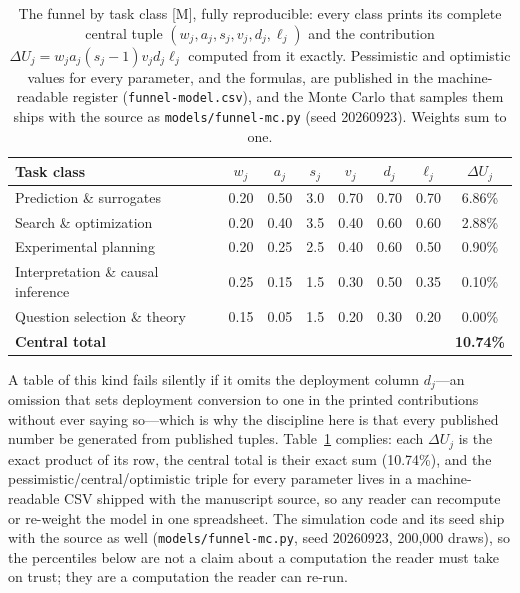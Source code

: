 \begin{table}[htbp]
  \centering
  \scriptsize
  \caption{The funnel by task class [M], fully reproducible: every class prints its complete central tuple $(w_j, a_j, s_j, v_j, d_j, \ell_j)$ and the contribution $\Delta U_j = w_j a_j (s_j{-}1) v_j d_j \ell_j$ computed from it exactly. Pessimistic and optimistic values for every parameter, and the formulas, are published in the machine-readable register (\texttt{funnel-model.csv}), and the Monte Carlo that samples them ships with the source as \texttt{models/funnel-mc.py} (seed 20260923). Weights sum to one.}
  \label{tab:funnel-classes}
  \setlength{\tabcolsep}{4.5pt}
  \begin{tabular}{p{33mm}ccccccc}
    \toprule
    Task class & $w_j$ & $a_j$ & $s_j$ & $v_j$ & $d_j$ & $\ell_j$ & $\Delta U_j$ \\
    \midrule
    Prediction \& surrogates & 0.20 & 0.50 & 3.0 & 0.70 & 0.70 & 0.70 & 6.86\% \\
    Search \& optimization & 0.20 & 0.40 & 3.5 & 0.40 & 0.60 & 0.60 & 2.88\% \\
    Experimental planning & 0.20 & 0.25 & 2.5 & 0.40 & 0.60 & 0.50 & 0.90\% \\
    Interpretation \& causal inference & 0.25 & 0.15 & 1.5 & 0.30 & 0.50 & 0.35 & 0.10\% \\
    Question selection \& theory & 0.15 & 0.05 & 1.5 & 0.20 & 0.30 & 0.20 & 0.00\% \\
    \midrule
    \textbf{Central total} & & & & & & & \textbf{10.74\%} \\
    \bottomrule
  \end{tabular}
\end{table}

A table of this kind fails silently if it omits the deployment column $d_j$---an omission that sets deployment conversion to one in the printed contributions without ever saying so---which is why the discipline here is that every published number be generated from published tuples. Table~\ref{tab:funnel-classes} complies: each $\Delta U_j$ is the exact product of its row, the central total is their exact sum (10.74\%), and the pessimistic/central/optimistic triple for every parameter lives in a machine-readable CSV shipped with the manuscript source, so any reader can recompute or re-weight the model in one spreadsheet. The simulation code and its seed ship with the source as well (\texttt{models/funnel-mc.py}, seed 20260923, 200{,}000 draws), so the percentiles below are not a claim about a computation the reader must take on trust; they are a computation the reader can re-run.

